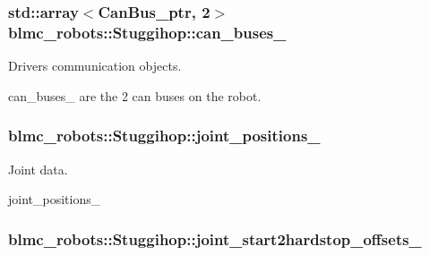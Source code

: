 \subsubsection[{\texorpdfstring{can\+\_\+buses\+\_\+}{can_buses_}}]{\setlength{\rightskip}{0pt plus 5cm}std\+::array$<${\bf Can\+Bus\+\_\+ptr}, 2$>$ blmc\+\_\+robots\+::\+Stuggihop\+::can\+\_\+buses\+\_\+\hspace{0.3cm}{\ttfamily [private]}}\hypertarget{classblmc__robots_1_1Stuggihop_a708d4483e73a19b8e98dd33d0c22e2aa}{}\label{classblmc__robots_1_1Stuggihop_a708d4483e73a19b8e98dd33d0c22e2aa}


Drivers communication objects. 

can\+\_\+buses\+\_\+ are the 2 can buses on the robot. 
\subsubsection[{\texorpdfstring{joint\+\_\+positions\+\_\+}{joint_positions_}}]{ blmc\+\_\+robots\+::\+Stuggihop\+::joint\+\_\+positions\+\_\+\hspace{0.3cm}{\ttfamily [private]}}\hypertarget{classblmc__robots_1_1Stuggihop_a9426a6b5b97a1d57a4db4691f0f4eac5}{}\label{classblmc__robots_1_1Stuggihop_a9426a6b5b97a1d57a4db4691f0f4eac5}


Joint data. 

joint\+\_\+positions\+\_\+ 
\subsubsection[{\texorpdfstring{joint\+\_\+start2hardstop\+\_\+offsets\+\_\+}{joint_start2hardstop_offsets_}}]{ blmc\+\_\+robots\+::\+Stuggihop\+::joint\+\_\+start2hardstop\+\_\+offsets\+\_\+\hspace{0.3cm}{\ttfamily [private]}}\hypertarget{classblmc__robots_1_1Stuggihop_a63813a55789c75aa4e4c7d1c783c857d}{}\label{classblmc__robots_1_1Stuggihop_a63813a55789c75aa4e4c7d1c783c857d}


